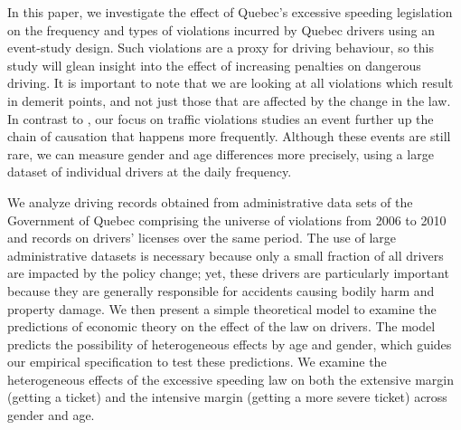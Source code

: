 In this paper, we investigate the effect of Quebec’s excessive speeding legislation
on the frequency and types of violations incurred by Quebec drivers 
using an event-study design. 
Such violations are a proxy for driving behaviour, 
so this study will glean insight into the effect of increasing penalties on dangerous driving. 
It is important to note that we are looking at all violations which result in demerit points, 
and not just those that are affected by the change in the law. 
% 
In contrast to \citet{meirambayeva2014}, 
our focus on traffic violations
studies an event further up the chain of causation that happens more frequently. 
Although these events are still rare,
we can measure gender and age differences more precisely, 
using a large dataset of individual drivers at the daily frequency. 
% 


% 
% 
% 
We analyze driving records obtained from administrative data sets 
of the Government of Quebec comprising the universe of violations 
from 2006 to 2010 and records on drivers’ licenses over the same period. 
The use of large administrative datasets is necessary because only a small fraction 
of all drivers are impacted by the policy change; 
yet, these drivers are particularly important because they are 
generally responsible for accidents causing bodily harm and property damage. 
% 
We then present a simple theoretical model to examine the predictions of economic theory 
on the effect of the law on drivers.
%
The model predicts the possibility of heterogeneous effects by age and gender,  
which guides our empirical specification to test these predictions. 
% 
We examine the heterogeneous effects of the excessive speeding law 
on both the extensive margin (getting a ticket) 
and the intensive margin (getting a more severe ticket) across gender and age. 
% 

